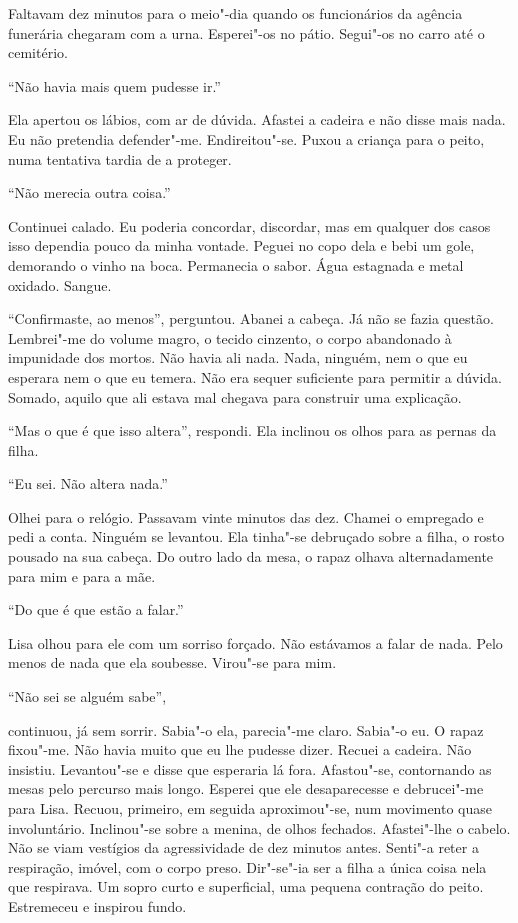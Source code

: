 Faltavam dez minutos para o meio"-dia quando os funcionários da agência
funerária chegaram com a urna. Esperei"-os no pátio. Segui"-os no carro
até o cemitério.

``Não havia mais quem pudesse ir.''

Ela apertou os lábios, com ar de dúvida. Afastei a cadeira e não disse
mais nada. Eu não pretendia defender"-me. Endireitou"-se. Puxou a
criança para o peito, numa tentativa tardia de a proteger.

``Não merecia outra coisa.''

Continuei calado. Eu poderia concordar, discordar, mas em qualquer dos
casos isso dependia pouco da minha vontade. Peguei no copo dela e bebi
um gole, demorando o vinho na boca. Permanecia o sabor. Água estagnada e
metal oxidado. Sangue.

``Confirmaste, ao menos'',
perguntou. Abanei a cabeça. Já não se fazia questão. Lembrei"-me do
volume magro, o tecido cinzento, o corpo abandonado à impunidade dos
mortos. Não havia ali nada. Nada, ninguém, nem o que eu esperara nem o
que eu temera. Não era sequer suficiente para permitir a dúvida. Somado,
aquilo que ali estava mal chegava para construir uma explicação.

``Mas o que é que isso altera'',
respondi. Ela inclinou os olhos para as pernas da filha.

``Eu sei. Não altera nada.''

Olhei para o relógio. Passavam vinte minutos das dez. Chamei o empregado
e pedi a conta. Ninguém se levantou. Ela tinha"-se debruçado sobre a
filha, o rosto pousado na sua cabeça. Do outro lado da mesa, o rapaz
olhava alternadamente para mim e para a mãe.

``Do que é que estão a falar.''

Lisa olhou para ele com um sorriso forçado. Não estávamos a falar de
nada. Pelo menos de nada que ela soubesse. Virou"-se para mim.

``Não sei se alguém sabe'',

continuou, já sem sorrir. Sabia"-o ela, parecia"-me claro. Sabia"-o eu.
O rapaz fixou"-me. Não havia muito que eu lhe pudesse dizer. Recuei a
cadeira. Não insistiu. Levantou"-se e disse que esperaria lá fora.
Afastou"-se, contornando as mesas pelo percurso mais longo. Esperei que
ele desaparecesse e debrucei"-me para Lisa. Recuou, primeiro, em seguida
aproximou"-se, num movimento quase involuntário. Inclinou"-se sobre a
menina, de olhos fechados. Afastei"-lhe o cabelo. Não se viam vestígios
da agressividade de dez minutos antes. Senti"-a reter a respiração,
imóvel, com o corpo preso. Dir"-se"-ia ser a filha a única coisa nela
que respirava. Um sopro curto e superficial, uma pequena contração do
peito. Estremeceu e inspirou fundo.

